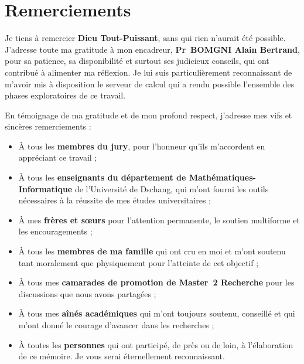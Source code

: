 \clearpage
\chapter*{Remerciements}

Je tiens à remercier \textbf{Dieu Tout-Puissant}, sans qui rien n'aurait été possible. J'adresse toute ma gratitude à mon encadreur, \textbf{Pr~BOMGNI Alain Bertrand}, pour sa patience, sa disponibilité et surtout ses judicieux conseils, qui ont contribué à alimenter ma réflexion. Je lui suis particulièrement reconnaissant de m'avoir mis à disposition le serveur de calcul qui a rendu possible l'ensemble des phases exploratoires de ce travail.

En témoignage de ma gratitude et de mon profond respect, j'adresse mes vifs et sincères remerciements :

\begin{itemize}[leftmargin=1.2em, itemsep=2pt]
    \item À tous les \textbf{membres du jury}, pour l'honneur qu'ils m'accordent en appréciant ce travail ;
    \item À tous les \textbf{enseignants du département de Mathématiques-Informatique} de l'Université de Dschang, qui m'ont fourni les outils nécessaires à la réussite de mes études universitaires ;
    \item À mes \textbf{frères et sœurs} pour l'attention permanente, le soutien multiforme et les encouragements ;
    \item À tous les \textbf{membres de ma famille} qui ont cru en moi et m'ont soutenu tant moralement que physiquement pour l'atteinte de cet objectif ;
    \item À tous mes \textbf{camarades de promotion de Master~2 Recherche} pour les discussions que nous avons partagées ;
    \item À tous mes \textbf{aînés académiques} qui m'ont toujours soutenu, conseillé et qui m'ont donné le courage d'avancer dans les recherches ;
    \item À toutes les \textbf{personnes} qui ont participé, de près ou de loin, à l'élaboration de ce mémoire. Je vous serai éternellement reconnaissant.
\end{itemize}
